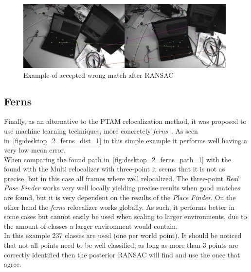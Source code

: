\begin{figure}[htpb]
  \centering
  \includegraphics[width=11cm]{img/wrong_inlier.png}
  \caption{Example of accepted wrong match after RANSAC}
  \label{fig:wrong_inlier}
\end{figure}


\subsection{Ferns}
\label{sub:ferns_results}

Finally, as an alternative to the PTAM relocalization method, it was proposed to use machine learning techniques, more concretely \textit{ferns}~\cite{Ozuysal2010}. As seen in~\ref{fig:desktop_2_ferns_dist_1} in this simple example it performs well having a very low mean error.\\

When comparing the found path in~\ref{fig:desktop_2_ferns_path_1} with the found with the Multi relocalizer with three-point it seems that it is not as precise, but in this case all frames where well relocalized. The three-point \textit{Real Pose Finder} works very well locally yielding precise results when good matches are found, but it is very dependent on the results of the \textit{Place Finder}. On the other hand the \textit{ferns} relocalizer works globally. As such, it performs better in some cases but cannot easily be used when scaling to larger environments, due to the amount of classes a larger environment would contain.\\

In this example 237 classes are used (one per world point). It should be noticed that not all points need to be well classified, as long as more than 3 points are correctly identified then the posterior RANSAC will find and use the once that agree.\\


